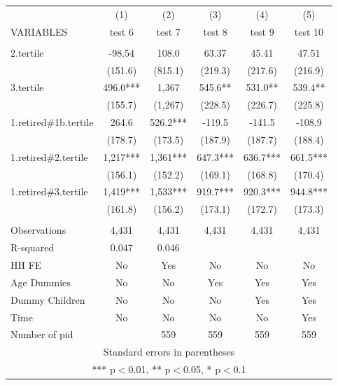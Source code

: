 \begin{tabular}{lccccc} \hline
 & (1) & (2) & (3) & (4) & (5) \\
VARIABLES & test 6 & test 7 & test 8 & test 9 & test 10 \\ \hline
 &  &  &  &  &  \\
2.tertile & -98.54 & 108.0 & 63.37 & 45.41 & 47.51 \\
 & (151.6) & (815.1) & (219.3) & (217.6) & (216.9) \\
3.tertile & 496.0*** & 1,367 & 545.6** & 531.0** & 539.4** \\
 & (155.7) & (1,267) & (228.5) & (226.7) & (225.8) \\
1.retired\#1b.tertile & 264.6 & 526.2*** & -119.5 & -141.5 & -108.9 \\
 & (178.7) & (173.5) & (187.9) & (187.7) & (188.4) \\
1.retired\#2.tertile & 1,217*** & 1,361*** & 647.3*** & 636.7*** & 661.5*** \\
 & (156.1) & (152.2) & (169.1) & (168.8) & (170.4) \\
1.retired\#3.tertile & 1,419*** & 1,533*** & 919.7*** & 920.3*** & 944.8*** \\
 & (161.8) & (156.2) & (173.1) & (172.7) & (173.3) \\
 &  &  &  &  &  \\
Observations & 4,431 & 4,431 & 4,431 & 4,431 & 4,431 \\
R-squared & 0.047 & 0.046 &  &  &  \\
HH FE & No & Yes & No & No & No \\
Age Dummies & No & No & Yes & Yes & Yes \\
Dummy Children & No & No & No & Yes & Yes \\
Time & No & No & No & No & Yes \\
 Number of pid &  & 559 & 559 & 559 & 559 \\ \hline
\multicolumn{6}{c}{ Standard errors in parentheses} \\
\multicolumn{6}{c}{ *** p$<$0.01, ** p$<$0.05, * p$<$0.1} \\
\end{tabular}
